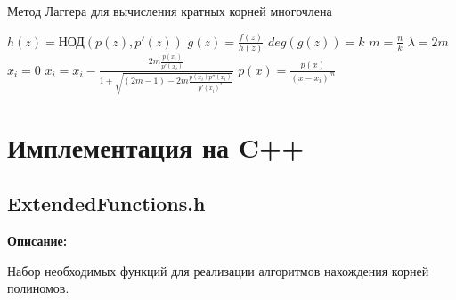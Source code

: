 \documentclass[a4paper,12pt]{article}
\begin{document}
\begin{algorithm}
            \caption{Метод Лаггера для вычисления кратных корней многочлена}\label{alg:Example}
            \begin{algorithmic}
            \State {} 
            \State {}
            \State $h(z)=\text{НОД}(p(z), p'(z))$
            \State $g(z) = \frac{f(z)}{h(z)}$
            \State {} 
            \State {}
            \State $deg(g(z)) = k$
            \State $m = \frac{n}{k}$
            \State $\lambda = 2m$
                \State {}
                \State $x_i = 0$
                    \State $\displaystyle x_{i} = x_i - \frac{2m\frac{p(x_i)}{p'(x_i)}}{1 + \sqrt{(2m-1)-2m \frac{p(x_i)p''(x_i)}{p'(x_i)^2}}}$
                \EndWhile
                \State $p(x) = \displaystyle\frac{p(x)}{(x-x_i)^m}$
            \EndFor
            \end{algorithmic}
\end{algorithm}


\clearpage
\newpage
\section{Имплементация на C++}

\subsection{ExtendedFunctions.h}
\textbf{Описание:}

Набор необходимых функций для реализации алгоритмов нахождения корней полиномов.
\end{document}
